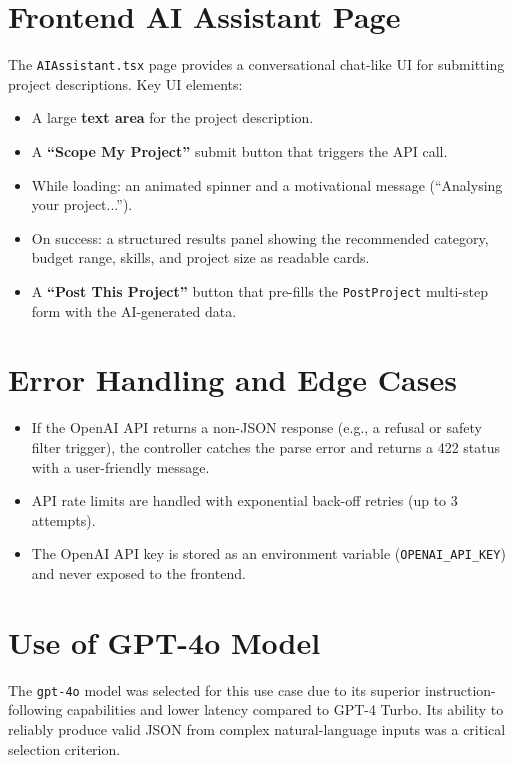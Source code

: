 \section{Frontend AI Assistant Page}

The \texttt{AIAssistant.tsx} page provides a conversational chat-like UI for submitting project descriptions. Key UI elements:

\begin{itemize}
  \item A large \textbf{text area} for the project description.
  \item A \textbf{``Scope My Project''} submit button that triggers the API call.
  \item While loading: an animated spinner and a motivational message (``Analysing your project...'').
  \item On success: a structured results panel showing the recommended category, budget range, skills, and project size as readable cards.
  \item A \textbf{``Post This Project''} button that pre-fills the \texttt{PostProject} multi-step form with the AI-generated data.
\end{itemize}

\section{Error Handling and Edge Cases}

\begin{itemize}
  \item If the OpenAI API returns a non-JSON response (e.g., a refusal or safety filter trigger), the controller catches the parse error and returns a 422 status with a user-friendly message.
  \item API rate limits are handled with exponential back-off retries (up to 3 attempts).
  \item The OpenAI API key is stored as an environment variable (\texttt{OPENAI\_API\_KEY}) and never exposed to the frontend.
\end{itemize}

\section{Use of GPT-4o Model}

The \texttt{gpt-4o} model was selected for this use case due to its superior instruction-following capabilities and lower latency compared to GPT-4 Turbo. Its ability to reliably produce valid JSON from complex natural-language inputs was a critical selection criterion.
